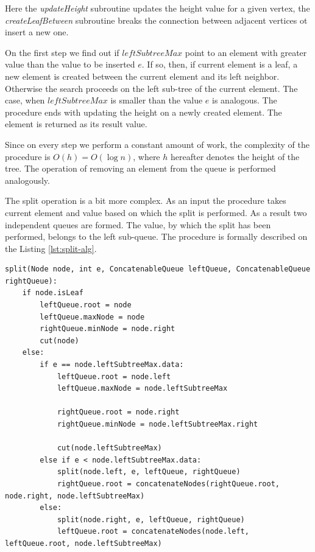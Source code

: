 \documentclass[a4paper,english,numberwithinsect,notab]{eurocg20-submission}
\begin{document}
	Here the \textit{updateHeight} subroutine updates the height value for a given vertex, the \textit{createLeafBetween} subroutine breaks the connection between adjacent vertices ot insert a new one.
	
	On the first step we find out if $leftSubtreeMax$ point to an element with greater value than the value to be inserted $e$. If so, then, if current element is a leaf, a new element is created between the current element and its left neighbor. Otherwise the search proceeds on the left sub-tree of the current element. The case, when $leftSubtreeMax$ is smaller than the value $e$ is analogous. The procedure ends with updating the height on a newly created element. The element is returned as its result value.
	
	Since on every step we perform a constant amount of work, the complexity of the procedure is $O(h)=O(\log n)$, where $h$ hereafter denotes the height of the tree. The operation of removing an element from the queue is performed analogously. 
	
	The split operation is a bit more complex. As an input the procedure takes current element and value based on which the split is performed. As a result two independent queues are formed. The value, by which the split has been performed, belongs to the left sub-queue. The procedure is formally described on the Listing \ref{lst:split-alg}.
	
	\begin{lstlisting}[caption={Queue split algorithm},label={lst:split-alg},captionpos=b]
split(Node node, int e, ConcatenableQueue leftQueue, ConcatenableQueue rightQueue):
    if node.isLeaf
        leftQueue.root = node
        leftQueue.maxNode = node
        rightQueue.minNode = node.right
        cut(node)
    else:
        if e == node.leftSubtreeMax.data:
            leftQueue.root = node.left
            leftQueue.maxNode = node.leftSubtreeMax

            rightQueue.root = node.right
            rightQueue.minNode = node.leftSubtreeMax.right

            cut(node.leftSubtreeMax)
        else if e < node.leftSubtreeMax.data:
            split(node.left, e, leftQueue, rightQueue)
            rightQueue.root = concatenateNodes(rightQueue.root, node.right, node.leftSubtreeMax)
        else:
            split(node.right, e, leftQueue, rightQueue)
            leftQueue.root = concatenateNodes(node.left,  leftQueue.root, node.leftSubtreeMax)
	\end{lstlisting}
	
\end{document}
